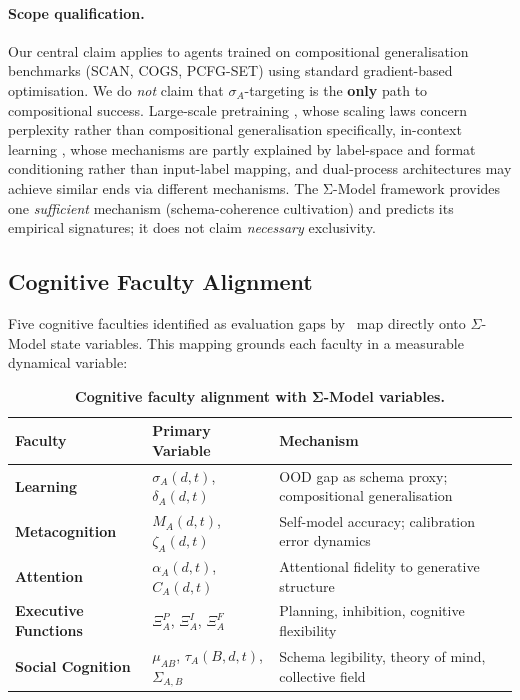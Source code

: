 \documentclass[10pt]{article}
\begin{document}
\paragraph{Scope qualification.}
Our central claim applies to agents trained on compositional
generalisation benchmarks (SCAN, COGS, PCFG-SET) using standard
gradient-based optimisation. We do \emph{not} claim that
$\sigma_A$-targeting is the \textbf{only} path to compositional
success. Large-scale pretraining \citep{kaplan2020scaling}, whose scaling laws concern perplexity rather than compositional generalisation specifically,
in-context learning \citep{min2022rethinking}, whose mechanisms are partly explained by label-space and format conditioning rather than input-label mapping, and dual-process
architectures \citep{noviello2025neuroscienceinspiredualprocess} may achieve similar ends via
different mechanisms. The Σ-Model framework provides one
\emph{sufficient} mechanism (schema-coherence cultivation) and
predicts its empirical signatures; it does not claim \emph{necessary}
exclusivity.

\subsection{Cognitive Faculty Alignment}\label{sec:cognitive-faculty-alignment}

Five cognitive faculties identified as evaluation gaps
by~\cite{burnell2026measuringprogressagi} map directly onto
$\Sigma$-Model state variables. This mapping grounds each faculty in a
measurable dynamical variable:

\begin{table}[htbp]
\centering
\caption{\textbf{Cognitive faculty alignment with Σ-Model variables.}}
\label{tab:faculty-alignment}
\begin{tabular}{>{\raggedright}p{2.8cm} >{\raggedright}p{3.2cm} >{\raggedright\arraybackslash}p{7.2cm}}
\toprule
\textbf{Faculty} & \textbf{Primary Variable} & \textbf{Mechanism} \\
\midrule
\textbf{Learning} & $\sigma_A(d,t)$, $\delta_A(d,t)$ & OOD gap as schema proxy; compositional generalisation \\
\textbf{Metacognition} & $\hat{M}_A(d,t)$, $\zeta_A(d,t)$ & Self-model accuracy; calibration error dynamics \\
\textbf{Attention} & $\alpha_A(d,t)$, $C_A(d,t)$ & Attentional fidelity to generative structure \\
\textbf{Executive Functions} & $\Xi_A^P$, $\Xi_A^I$, $\Xi_A^F$ & Planning, inhibition, cognitive flexibility \\
\textbf{Social Cognition} & $\mu_{AB}$, $\tau_A(B,d,t)$, $\Sigma_{A,B}$ & Schema legibility, theory of mind, collective field \\
\bottomrule
\end{tabular}
\end{table}
\end{document}

